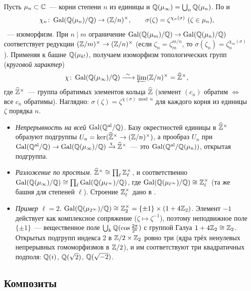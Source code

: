 \begin{example}
Пусть $\mu_n\subset\mathbb C$~--- корни степени $n$ из единицы и $\mathbb Q(\mu_\infty)=\bigcup_n\mathbb Q(\mu_n)$. По  и 
\[
\chi_n\colon\Gal(\Q(\mu_n)/\Q)\to(\Z/n)^\times,\qquad\sigma(\zeta)=\zeta^{\chi_n(\sigma)}\ (\zeta\in\mu_n),
\]
~--- изоморфизм. При $n\mid m$ ограничение $\operatorname{Gal}(\mathbb Q(\mu_m)/\mathbb Q)\to\operatorname{Gal}(\mathbb Q(\mu_n)/\mathbb Q)$ соответствует редукции
$(\mathbb Z/m)^\times\to(\mathbb Z/n)^\times$ (если $\zeta_n=\zeta_m^{m/n}$, то $\sigma(\zeta_n)=\zeta_n^{\chi_m(\sigma)}$).
Применяя  к башне $\mathbb Q(\mu_{k!})$, получаем изоморфизм топологических групп (\emph{круговой характер})
\[
\chi\colon\Gal(\Q(\mu_\infty)/\Q)\xrightarrow{\ \sim\ }\varlim(\Z/n)^\times=\Zh^\times,
\]
где $\widehat{\mathbb Z}^\times$~--- группа обратимых элементов кольца $\widehat{\mathbb Z}$ (элемент $(c_n)$ обратим $\iff$ все $c_n$ обратимы).
Наглядно: $\sigma(\zeta)=\zeta^{\chi(\sigma)\bmod n}$ для каждого корня из единицы $\zeta$ порядка $n$.

\begin{itemize}[leftmargin=*]
\item \emph{Непрерывность на всей $\operatorname{Gal}(\mathbb Q^{\mathrm{al}}/\mathbb Q)$.} Базу окрестностей единицы в $\widehat{\mathbb Z}^\times$ образуют подгруппы
$U_n=\ker(\widehat{\mathbb Z}^\times\to(\mathbb Z/n)^\times)$, а прообраз $U_n$ при
$\operatorname{Gal}(\mathbb Q^{\mathrm{al}}/\mathbb Q)\to\operatorname{Gal}(\mathbb Q(\mu_\infty)/\mathbb Q)\xrightarrow{\chi}\widehat{\mathbb Z}^\times$~--- это $\operatorname{Gal}(\mathbb Q^{\mathrm{al}}/\mathbb Q(\mu_n))$, открытая подгруппа.
\item \emph{Разложение по простым.} $\widehat{\mathbb Z}^\times\cong\prod_\ell\mathbb Z_\ell^\times$, и соответственно
$\operatorname{Gal}(\mathbb Q(\mu_\infty)/\mathbb Q)\cong\prod_\ell\operatorname{Gal}(\mathbb Q(\mu_{\ell^\infty})/\mathbb Q)$, где $\operatorname{Gal}(\mathbb Q(\mu_{\ell^\infty})/\mathbb Q)\cong\mathbb Z_\ell^\times$
(та же башня для степеней $\ell$). Строение $\mathbb Z_\ell^\times$ дано в .
\item \emph{Пример $\ell=2$.} $\operatorname{Gal}(\mathbb Q(\mu_{2^\infty})/\mathbb Q)\cong\mathbb Z_2^\times=\{\pm1\}\times(1+4\mathbb Z_2)$. Элемент $-1$ действует
как комплексное сопряжение ($\zeta\mapsto\zeta^{-1}$), поэтому неподвижное поле $\{\pm1\}$~--- вещественное поле
$\bigcup_k\mathbb Q(\cos\frac{2\pi}{2^k})$ с группой Галуа $1+4\mathbb Z_2\cong\mathbb Z_2$. Открытых подгрупп индекса 2 в
$\mathbb Z/2\times\mathbb Z_2$ ровно три (ядра трёх ненулевых непрерывных гомоморфизмов в $\mathbb Z/2$), и им соответствуют три квадратичных
подполя: $\mathbb Q(i)$, $\mathbb Q(\sqrt2)$, $\mathbb Q(\sqrt{-2})$.
\end{itemize}
\end{example}

\subsection*{Композиты}

